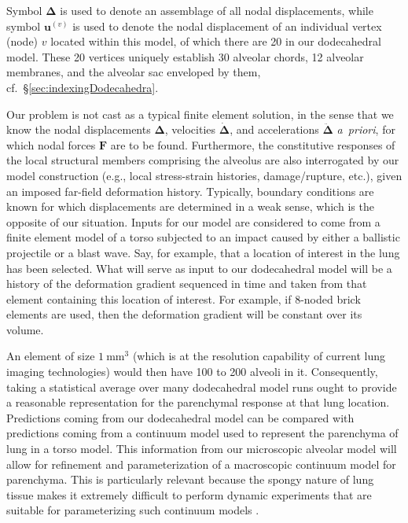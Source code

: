Symbol $\boldsymbol{\Delta}$ is used to denote an assemblage of all nodal displacements, while symbol $\mathbf{u}^{(v)}$ is used to denote the nodal displacement of an individual vertex (node) $v$ located within this model, of which there are 20 in our dodecahedral model.  These 20 vertices uniquely establish 30 alveolar chords, 12 alveolar membranes, and the alveolar sac enveloped by them, cf.\ \S\ref{sec:indexingDodecahedra}.

Our problem is not cast as a typical finite element solution, in the sense that we know the nodal displacements $\boldsymbol{\Delta}$, velocities $\dot{\boldsymbol{\Delta}}$, and accelerations $\ddot{\boldsymbol{\Delta}}$ \textit{a~priori}, for which nodal forces $\boldsymbol{F}$ are to be found.  Furthermore, the constitutive responses of the local structural members comprising the alveolus are also interrogated by our model construction (e.g., local stress-strain histories, damage/rupture, etc.), given an imposed far-field deformation history.  Typically, boundary conditions are known for which displacements are determined in a weak sense, which is the opposite of our situation. Inputs for our model are considered to come from a finite element model of a torso subjected to an impact caused by either a ballistic projectile or a blast wave.  Say, for example, that a location of interest in the lung has been selected.  What will serve as input to our dodecahedral model will be a history of the deformation gradient sequenced in time and taken from that element containing this location of interest.  For example, if 8-noded brick elements are used, then the deformation gradient will be constant over its volume.  

An element of size $1~\text{mm}^3$ (which is at the resolution capability of current lung imaging technologies) would then have 100 to 200 alveoli in it.  Consequently, taking a statistical average over many dodecahedral model runs ought to provide a reasonable representation for the parenchymal response at that lung location.  Predictions coming from our dodecahedral model can be compared with predictions coming from a continuum model used to represent the parenchyma of lung in a torso model.  This information from our micro\-scopic alveolar model will allow for refinement and parameterization of a macro\-scopic continuum model for parenchyma.  This is particularly relevant because the spongy nature of lung tissue makes it extremely difficult to perform dynamic experiments that are suitable for parameterizing such continuum models \cite{saraf2007,sanborn2013}.

